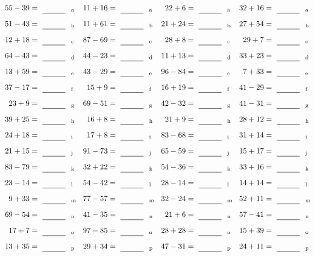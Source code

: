 \documentclass
[
  draft    = true,
  fontsize = 11pt,
  parskip  = half-
]
{scrartcl}
\begin{document}
\clearpage
\begin{align*}
    \pline{55-39}&=\rline{a}
  & \pline{11+16}&=\rline{a}
  & \pline{22+6}&=\rline{a}
  & \pline{32+16}&=\rline{a} \\[1ex]
    \pline{51-43}&=\rline{b}
  & \pline{11+61}&=\rline{b}
  & \pline{21+24}&=\rline{b}
  & \pline{27+54}&=\rline{b} \\[1ex]
    \pline{12+18}&=\rline{c}
  & \pline{87-69}&=\rline{c}
  & \pline{28+8}&=\rline{c}
  & \pline{29+7}&=\rline{c} \\[1ex]
    \pline{64-43}&=\rline{d}
  & \pline{44-23}&=\rline{d}
  & \pline{11+13}&=\rline{d}
  & \pline{33+23}&=\rline{d} \\[1ex]
    \pline{13+59}&=\rline{e}
  & \pline{43-29}&=\rline{e}
  & \pline{96-84}&=\rline{e}
  & \pline{7+33}&=\rline{e} \\[1ex]
    \pline{37-17}&=\rline{f}
  & \pline{15+9}&=\rline{f}
  & \pline{16+19}&=\rline{f}
  & \pline{41-29}&=\rline{f} \\[1ex]
    \pline{23+9}&=\rline{g}
  & \pline{69-51}&=\rline{g}
  & \pline{42-32}&=\rline{g}
  & \pline{41-31}&=\rline{g} \\[1ex]
    \pline{39+25}&=\rline{h}
  & \pline{16+8}&=\rline{h}
  & \pline{21+9}&=\rline{h}
  & \pline{28+12}&=\rline{h} \\[1ex]
    \pline{24+18}&=\rline{i}
  & \pline{17+8}&=\rline{i}
  & \pline{83-68}&=\rline{i}
  & \pline{31+14}&=\rline{i} \\[1ex]
    \pline{21+15}&=\rline{j}
  & \pline{91-73}&=\rline{j}
  & \pline{65-59}&=\rline{j}
  & \pline{15+17}&=\rline{j} \\[1ex]
    \pline{83-79}&=\rline{k}
  & \pline{32+22}&=\rline{k}
  & \pline{54-36}&=\rline{k}
  & \pline{33+16}&=\rline{k} \\[1ex]
    \pline{23-14}&=\rline{l}
  & \pline{54-42}&=\rline{l}
  & \pline{28-14}&=\rline{l}
  & \pline{14+14}&=\rline{l} \\[1ex]
    \pline{9+33}&=\rline{m}
  & \pline{77-57}&=\rline{m}
  & \pline{32-24}&=\rline{m}
  & \pline{52+11}&=\rline{m} \\[1ex]
    \pline{69-54}&=\rline{n}
  & \pline{41-35}&=\rline{n}
  & \pline{21+6}&=\rline{n}
  & \pline{57-41}&=\rline{n} \\[1ex]
    \pline{17+7}&=\rline{o}
  & \pline{97-85}&=\rline{o}
  & \pline{28+28}&=\rline{o}
  & \pline{15+39}&=\rline{o} \\[1ex]
    \pline{13+35}&=\rline{p}
  & \pline{29+34}&=\rline{p}
  & \pline{47-31}&=\rline{p}
  & \pline{24+11}&=\rline{p}
\end{align*}
\end{document}
